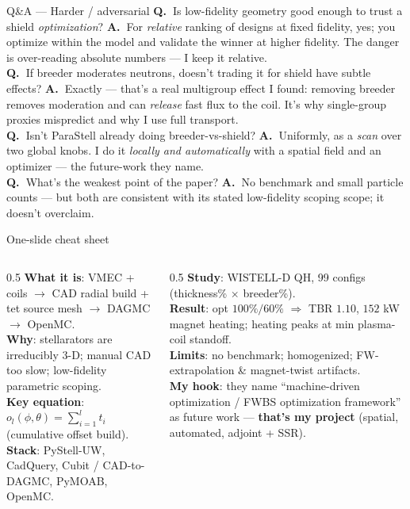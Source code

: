\documentclass[aspectratio=169]{beamer}
\newcommand{\q}[1]{\textbf{\color{key}Q.\ }#1}
\newcommand{\an}[1]{\textbf{A.\ }#1}
\begin{document}
\begin{frame}{Q\&A --- Harder / adversarial}
  \small
  \q{Is low-fidelity geometry good enough to trust a shield \emph{optimization}?} \an{For \emph{relative} ranking of designs at fixed fidelity, yes; you optimize within the model and validate the winner at higher fidelity. The danger is over-reading absolute numbers --- I keep it relative.}\\[2pt]
  \q{If breeder moderates neutrons, doesn't trading it for shield have subtle effects?} \an{Exactly --- that's a real multigroup effect I found: removing breeder removes moderation and can \emph{release} fast flux to the coil. It's why single-group proxies mispredict and why I use full transport.}\\[2pt]
  \q{Isn't ParaStell already doing breeder-vs-shield?} \an{Uniformly, as a \emph{scan} over two global knobs. I do it \emph{locally and automatically} with a spatial field and an optimizer --- the future-work they name.}\\[2pt]
  \q{What's the weakest point of the paper?} \an{No benchmark and small particle counts --- but both are consistent with its stated low-fidelity scoping scope; it doesn't overclaim.}
\end{frame}

\begin{frame}{One-slide cheat sheet}
  \footnotesize
  \begin{columns}[t]
    \begin{column}{0.5\textwidth}
      \textbf{What it is}: VMEC + coils $\to$ CAD radial build + tet source mesh $\to$ DAGMC $\to$ OpenMC.\\[3pt]
      \textbf{Why}: stellarators are irreducibly 3-D; manual CAD too slow; low-fidelity parametric scoping.\\[3pt]
      \textbf{Key equation}: $o_l(\phi,\theta)=\sum_{i=1}^{l}t_i$ (cumulative offset build).\\[3pt]
      \textbf{Stack}: PyStell-UW, CadQuery, Cubit / CAD-to-DAGMC, PyMOAB, OpenMC.
    \end{column}
    \begin{column}{0.5\textwidth}
      \textbf{Study}: WISTELL-D QH, 99 configs (thickness\% $\times$ breeder\%).\\[3pt]
      \textbf{Result}: opt $100\%/60\%$ $\Rightarrow$ TBR $1.10$, $152$ kW magnet heating; heating peaks at min plasma-coil standoff.\\[3pt]
      \textbf{Limits}: no benchmark; homogenized; FW-extrapolation \& magnet-twist artifacts.\\[3pt]
      \textbf{My hook}: they name ``machine-driven optimization / FWBS optimization framework'' as future work --- \textbf{that's my project} (spatial, automated, adjoint + SSR).
    \end{column}
  \end{columns}
\end{frame}
\end{document}
